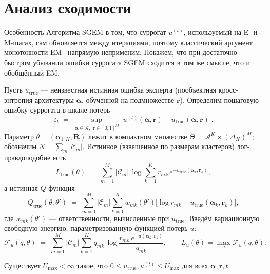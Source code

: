 \section{Анализ сходимости}
\label{ch:theory}

Особенность Алгоритма SGEM в том, что суррогат $u^{(t)}$, используемый на
E- и M-шагах, сам обновляется между итерациями, поэтому классический
аргумент монотонности EM~\cite{dempster1977em, wu1983convergence}
напрямую неприменим. Покажем, что при достаточно быстром убывании ошибки
суррогата SGEM сходится в том же смысле, что и обобщённый EM.

Пусть $u_{\mathrm{true}}$ --- неизвестная истинная ошибка эксперта
(пообъектная кросс-энтропия архитектуры $\boldsymbol{\alpha}$, обученной
на подмножестве $\mathbf{r}$). Определим пошаговую ошибку суррогата в
шкале потерь
\begin{equation}
\label{eq:eps_t}
\varepsilon_t \;=\; \sup_{\boldsymbol{\alpha} \in \mathcal{A}, \;
\mathbf{r} \in [0, 1]^M}
\bigl|u^{(t)}(\boldsymbol{\alpha}, \mathbf{r})
- u_{\mathrm{true}}(\boldsymbol{\alpha}, \mathbf{r})\bigr|.
\end{equation}
Параметр $\theta = (\boldsymbol{\alpha}_{1:K}, \mathbf{R})$ лежит в
компактном множестве $\Theta = \mathcal{A}^K \times (\Delta_K)^M$;
обозначим $N = \sum_m |\mathcal{C}_m|$. Истинное (взвешенное по размерам
кластеров) лог-правдоподобие есть
\begin{equation}
\label{eq:Ltrue}
L_{\mathrm{true}}(\theta) \;=\; \sum_{m=1}^M |\mathcal{C}_m|\,\log
\sum_{k=1}^K r_{mk}\, e^{-u_{\mathrm{true}}(\boldsymbol{\alpha}_k, \mathbf{r}_k)},
\end{equation}
а истинная $Q$-функция ---
\begin{equation}
\label{eq:Qtrue}
Q_{\mathrm{true}}(\theta; \theta') \;=\; \sum_{m=1}^M |\mathcal{C}_m|
\sum_{k=1}^K w_{mk}(\theta')
\bigl[\log r_{mk} - u_{\mathrm{true}}(\boldsymbol{\alpha}_k, \mathbf{r}_k)\bigr],
\end{equation}
где $w_{mk}(\theta')$ --- ответственности, вычисленные при
$u_{\mathrm{true}}$. Введём вариационную свободную энергию,
параметризованную функцией потерь $u$:
\[
\mathcal{F}_u(q, \theta) \;=\; \sum_{m=1}^{M} |\mathcal{C}_m|
\sum_{k=1}^{K} q_{mk}\, \log \frac{r_{mk}\, e^{-u(\boldsymbol{\alpha}_k, \mathbf{r}_k)}}{q_{mk}},
\qquad L_u(\theta) = \max_q \mathcal{F}_u(q, \theta).
\]

\begin{assumption}
\label{ass:bounded}
Существует $U_{\max} < \infty$ такое, что
$0 \leq u_{\mathrm{true}}, u^{(t)} \leq U_{\max}$ для всех
$\boldsymbol{\alpha}, \mathbf{r}, t$.
\end{assumption}

